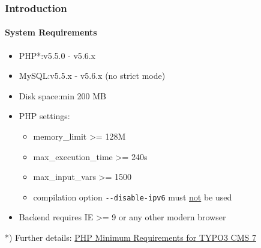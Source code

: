 %
\begin{frame}[fragile]
	\frametitle{Introduction}
	\framesubtitle{System Requirements}

	\begin{itemize}
		\item PHP*:\tabto{2.2cm}v5.5.0 - v5.6.x
		\item MySQL:\tabto{2.2cm}v5.5.x - v5.6.x (no strict mode)
		\item Disk space:\tabto{2.2cm}min 200 MB
		\item PHP settings:

			\begin{itemize}
				\item memory\_limit >= 128M
				\item max\_execution\_time >= 240s
				\item max\_input\_vars >= 1500
				\item compilation option \texttt{-}\texttt{-disable-ipv6} must \underline{not} be used
			\end{itemize}

		\item Backend requires IE >= 9 or any other modern browser

	\end{itemize}

	\vspace{0.8cm}

	*) Further details: \href{http://typo3.org/news/article/php-minimum-requirements-for-typo3-cms-7/}{PHP Minimum Requirements for TYPO3 CMS 7}

\end{frame}

